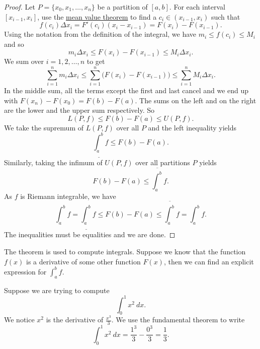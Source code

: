 \documentclass[12pt]{book}
\begin{document}
\begin{proof}
Let $P = \{ x_0, x_1, \ldots, x_n \}$ be a partition of $[a,b]$.
For each interval $[x_{i-1},x_i]$, use the
\hyperref[thm:mvt]{mean value theorem} to find a
$c_i \in (x_{i-1},x_i)$ such that
\begin{equation*}
f(c_i) \Delta x_i = F'(c_i) (x_i - x_{i-1}) = F(x_i) - F(x_{i-1}) .
\end{equation*}
Using the notation from the definition of the integral, we have
$m_i \leq f(c_i) \leq M_i$ and so
\begin{equation*}
m_i \Delta x_i \leq F(x_i) - F(x_{i-1}) \leq M_i \Delta x_i .
\end{equation*}
We sum over $i = 1,2, \ldots, n$ to get
\begin{equation*}
\sum_{i=1}^n m_i \Delta x_i
\leq \sum_{i=1}^n \bigl(F(x_i) - F(x_{i-1}) \bigr)
\leq \sum_{i=1}^n M_i \Delta x_i .
\end{equation*}
In the middle sum, all the terms except the first and last cancel 
and we end up with $F(x_n)-F(x_0) = F(b)-F(a)$.
The sums on the left
and on the right are the lower and the upper sum respectively.
So
\begin{equation*}
L(P,f) \leq F(b)-F(a) \leq U(P,f) .
\end{equation*}
We take the supremum of $L(P,f)$ over all $P$ and the left inequality
yields 
\begin{equation*}
\underline{\int_a^b} f \leq F(b)-F(a) .
\end{equation*}
Similarly, taking
the infimum of $U(P,f)$ over all partitions $P$ yields
\begin{equation*}
F(b)-F(a) \leq \overline{\int_a^b} f .
\end{equation*}
As $f$ is Riemann integrable, we have
\begin{equation*}
\int_a^b f =
\underline{\int_a^b} f \leq F(b)-F(a) \leq \overline{\int_a^b} f
= \int_a^b f .
\end{equation*}
The inequalities must be equalities and we are done.
\end{proof}

The theorem is used to compute integrals.
Suppose we know that
the function $f(x)$ is a derivative of some other function $F(x)$,
then we can find an explicit expression for $\int_a^b f$. 

\begin{example}
Suppose we are trying to compute
\begin{equation*}
\int_0^1 x^2 ~dx .
\end{equation*}
We notice $x^2$ is the derivative of $\frac{x^3}{3}$.
We
use the fundamental theorem to write 
\begin{equation*}
\int_0^1 x^2 ~dx =
\frac{1^3}{3}
-
\frac{0^3}{3}
= \frac{1}{3}.
\end{equation*}
\end{example}
\end{document}
